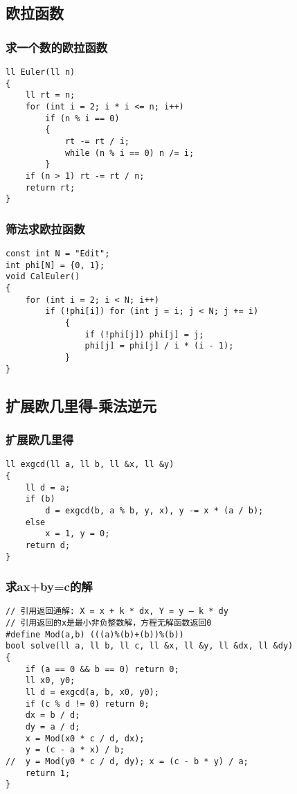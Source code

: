 \documentclass[a4]{article}
\begin{document}
\subsection{欧拉函数}
\subsubsection{求一个数的欧拉函数}
\begin{lstlisting}
ll Euler(ll n)
{
    ll rt = n;
    for (int i = 2; i * i <= n; i++)
        if (n % i == 0)
        {
            rt -= rt / i;
            while (n % i == 0) n /= i;
        }
    if (n > 1) rt -= rt / n;
    return rt;
}
\end{lstlisting}
\subsubsection{筛法求欧拉函数}
\begin{lstlisting}
const int N = "Edit";
int phi[N] = {0, 1};
void CalEuler()
{
    for (int i = 2; i < N; i++)
        if (!phi[i]) for (int j = i; j < N; j += i)
            {
                if (!phi[j]) phi[j] = j;
                phi[j] = phi[j] / i * (i - 1);
            }
}
\end{lstlisting}
\subsection{扩展欧几里得-乘法逆元}
\subsubsection{扩展欧几里得}
\begin{lstlisting}
ll exgcd(ll a, ll b, ll &x, ll &y)
{
    ll d = a;
    if (b)
        d = exgcd(b, a % b, y, x), y -= x * (a / b);
    else
        x = 1, y = 0;
    return d;
}
\end{lstlisting}
\subsubsection{求ax+by=c的解}
\begin{lstlisting}
// 引用返回通解: X = x + k * dx, Y = y – k * dy
// 引用返回的x是最小非负整数解，方程无解函数返回0
#define Mod(a,b) (((a)%(b)+(b))%(b))
bool solve(ll a, ll b, ll c, ll &x, ll &y, ll &dx, ll &dy)
{
    if (a == 0 && b == 0) return 0;
    ll x0, y0;
    ll d = exgcd(a, b, x0, y0);
    if (c % d != 0) return 0;
    dx = b / d;
    dy = a / d;
    x = Mod(x0 * c / d, dx);
    y = (c - a * x) / b;
//  y = Mod(y0 * c / d, dy); x = (c - b * y) / a;
    return 1;
}
\end{lstlisting}
\end{document}
